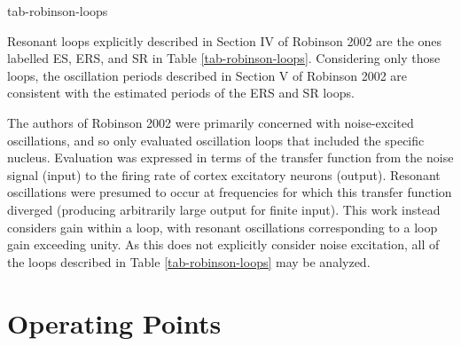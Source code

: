 {tab-robinson-loops}

Resonant loops explicitly described in Section IV of Robinson 2002 are the
ones labelled ES, ERS, and SR in Table \ref{tab-robinson-loops}. Considering
only those loops, the oscillation periods described in Section V of
Robinson 2002 are consistent with the estimated periods of the ERS and
SR loops.

The authors of Robinson 2002 were primarily concerned with noise-excited
oscillations, and so only evaluated oscillation loops that included the
specific nucleus. Evaluation was expressed in terms of the transfer
function from the noise signal (input) to the firing rate of cortex
excitatory neurons (output). Resonant oscillations were presumed to occur
at frequencies for which this transfer function diverged (producing
arbitrarily large output for finite input). This work instead considers
gain within a loop, with resonant oscillations corresponding to a loop
gain exceeding unity. As this does not explicitly consider noise excitation,
all of the loops described in Table \ref{tab-robinson-loops} may be
analyzed.

%
%
\section{Operating Points}
\label{sect-robinson-math-dc}

